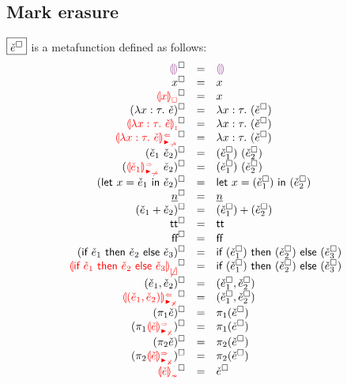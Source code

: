 \documentclass[formalism.tex]{subfiles}
\begin{document}
\subsection{Mark erasure}
\label{sec:marked-mark-erasure}
$\judgbox{\erase{\ECMV}}$ is a metafunction defined as follows:
%
\newcommand{\erasesToRow}[2]{\erase{#1} & = & #2}
\[\begin{array}{rcl}
  \erasesToRow{\ECEHole}{\EEHole} \\
  \erasesToRow{x}{x} \\
  \erasesToRow{\ECFree{x}}{x} \\
  \erasesToRow{(\ECLam{x}{\TMV}{\ECMV})}{\ELam{x}{\TMV}{(\erase{\ECMV})}} \\
  \erasesToRow{\ECLamInconAsc{x}{\TMV}{\ECMV}}{\ELam{x}{\TMV}{(\erase{\ECMV})}} \\
  \erasesToRow{\ECLamAnaNonMatchedArrow{x}{\TMV}{\ECMV}}{\ECLam{x}{\TMV}{(\erase{\ECMV})}} \\
  \erasesToRow{(\ECAp{\ECMV_1}{\ECMV_2})}{\EAp{(\erase{\ECMV_1})}{(\erase{\ECMV_2})}} \\
  \erasesToRow{(\ECApSynNonMatchedArrow{\ECMV_1}{\ECMV_2})}{\ECAp{(\erase{\ECMV_1})}{(\erase{\ECMV_2})}} \\
  \erasesToRow{(\ECLet{x}{\ECMV_1}{\ECMV_2})}{\ELet{x}{(\erase{\ECMV_1})}{(\erase{\ECMV_2})}} \\
  \erasesToRow{\ECNumMV}{\ENumMV} \\
  \erasesToRow{(\ECPlus{\ECMV_1}{\ECMV_2})}{\EPlus{(\erase{\ECMV_1})}{(\erase{\ECMV_2})}} \\
  \erasesToRow{\ECTrue}{\ETrue} \\
  \erasesToRow{\ECFalse}{\EFalse} \\
  \erasesToRow{(\ECIf{\ECMV_1}{\ECMV_2}{\ECMV_3})}{\EIf{(\erase{\ECMV_1})}{(\erase{\ECMV_2})}{(\erase{\ECMV_3})}} \\
  \erasesToRow{\ECInconBr{\ECMV_1}{\ECMV_2}{\ECMV_3}}{\EIf{(\erase{\ECMV_1})}{(\erase{\ECMV_2})}{(\erase{\ECMV_3})}} \\
  \erasesToRow{\ECPair{\ECMV_1}{\ECMV_2}}{\ECPair{\erase{\ECMV_1}}{\erase{\ECMV_2}}} \\
  \erasesToRow{\ECPairAnaNonMatchedProd{\ECMV_1}{\ECMV_2}}{\ECPair{\erase{\ECMV_1}}{\erase{\ECMV_2}}} \\
  \erasesToRow{(\ECProjL{\ECMV})}{\ECProjL{(\erase{\ECMV})}} \\
  \erasesToRow{(\ECProjLSynNonMatchedProd{\ECMV})}{\ECProjL{(\erase{\ECMV})}} \\
  \erasesToRow{(\ECProjR{\ECMV})}{\ECProjR{(\erase{\ECMV})}} \\
  \erasesToRow{(\ECProjRSynNonMatchedProd{\ECMV})}{\ECProjR{(\erase{\ECMV})}} \\
  \erasesToRow{\ECInconType{\ECMV}}{\erase{\ECMV}} \\
\end{array}\]
\end{document}

